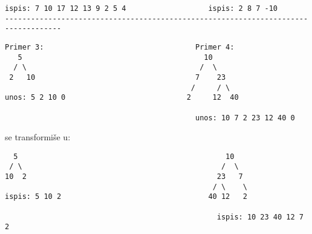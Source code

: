 \begin{enumerate}
\begin{verbatim}
ispis: 7 10 17 12 13 9 2 5 4                   ispis: 2 8 7 -10
-----------------------------------------------------------------------------------
\end{verbatim}


\begin{verbatim}
Primer 3:                                   Primer 4:
   5                                          10
  / \                                        /  \
 2   10                                     7    23
                                           /     / \
unos: 5 2 10 0                            2     12  40

                                            unos: 10 7 2 23 12 40 0
\end{verbatim}
se transformi\v se u:
\begin{verbatim}
  5                                                10
 / \                                              /  \
10  2                                            23   7
                                                / \    \
ispis: 5 10 2                                  40 12   2

                                                 ispis: 10 23 40 12 7 2

\end{verbatim}
\end{enumerate}


